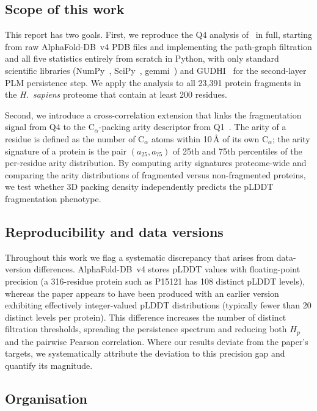 \subsection*{Scope of this work}

This report has two goals.
First, we reproduce the Q4 analysis of~\cite{cazals2025alphafold} in full,
starting from raw AlphaFold-DB~v4 PDB files and implementing the
path-graph filtration and all five statistics entirely from scratch in
Python, with only standard scientific libraries
(NumPy~\cite{harris2020numpy},
SciPy~\cite{virtanen2020scipy},
gemmi~\cite{wojdyr2022gemmi}) and
GUDHI~\cite{gudhi2015} for the second-layer PLM persistence step.
We apply the analysis to all 23{,}391 protein fragments in the
\textit{H.~sapiens} proteome that contain at least 200 residues.

Second, we introduce a cross-correlation extension that links the
fragmentation signal from Q4 to the $\mathrm{C}_\alpha$-packing arity
descriptor from Q1~\cite{cazals2025alphafold}.
The arity of a residue is defined as the number of $\mathrm{C}_\alpha$
atoms within 10\,\AA{} of its own $\mathrm{C}_\alpha$; the arity
signature of a protein is the pair $(a_{25}, a_{75})$ of 25th and 75th
percentiles of the per-residue arity distribution.
By computing arity signatures proteome-wide and comparing the arity
distributions of fragmented versus non-fragmented proteins, we test
whether 3D packing density independently predicts the pLDDT fragmentation
phenotype.

\subsection*{Reproducibility and data versions}

Throughout this work we flag a systematic discrepancy that arises from
data-version differences.
AlphaFold-DB~v4 stores pLDDT values with floating-point precision
(a 316-residue protein such as P15121 has 108 distinct pLDDT levels),
whereas the paper appears to have been produced with an earlier version
exhibiting effectively integer-valued pLDDT distributions (typically fewer
than 20 distinct levels per protein).
This difference increases the number of distinct filtration thresholds,
spreading the persistence spectrum and reducing both $H_p$ and the
pairwise Pearson correlation.
Where our results deviate from the paper's targets, we systematically
attribute the deviation to this precision gap and quantify its magnitude.

\subsection*{Organisation}

